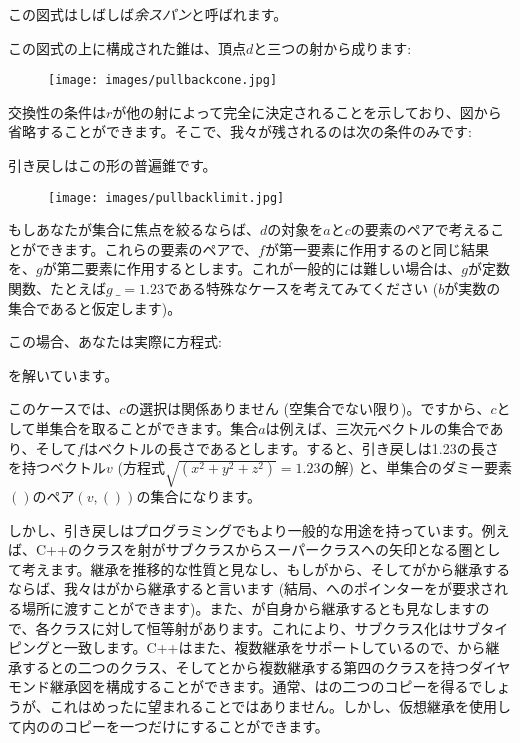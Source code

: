 
この図式はしばしば\emph{余スパン}と呼ばれます。

この図式の上に構成された錐は、頂点$d$と三つの射から成ります: 


\begin{figure}[H]
  \centering
  \texttt{[image: images/pullbackcone.jpg]}
\end{figure}

\noindent
交換性の条件は$r$が他の射によって完全に決定されることを示しており、図から省略することができます。そこで、我々が残されるのは次の条件のみです: 


引き戻しはこの形の普遍錐です。

\begin{figure}[H]
  \centering
  \texttt{[image: images/pullbacklimit.jpg]}
\end{figure}

\noindent
もしあなたが集合に焦点を絞るならば、$d$の対象を$a$と$c$の要素のペアで考えることができます。これらの要素のペアで、$f$が第一要素に作用するのと同じ結果を、$g$が第二要素に作用するとします。これが一般的には難しい場合は、$g$が定数関数、たとえば$g~\_ = 1.23$である特殊なケースを考えてみてください ($b$が実数の集合であると仮定します)。

この場合、あなたは実際に方程式: 


を解いています。

このケースでは、$c$の選択は関係ありません (空集合でない限り)。ですから、$c$として単集合を取ることができます。集合$a$は例えば、三次元ベクトルの集合であり、そして$f$はベクトルの長さであるとします。すると、引き戻しは1.23の長さを持つベクトル$v$ (方程式$\sqrt{(x^{2}+y^{2}+z^{2})} = 1.23$の解) と、単集合のダミー要素$()$のペア$(v, ())$の集合になります。

しかし、引き戻しはプログラミングでもより一般的な用途を持っています。例えば、C++のクラスを射がサブクラスからスーパークラスへの矢印となる圏として考えます。継承を推移的な性質と見なし、もしがから、そしてがから継承するならば、我々はがから継承すると言います (結局、へのポインターをが要求される場所に渡すことができます)。また、が自身から継承するとも見なしますので、各クラスに対して恒等射があります。これにより、サブクラス化はサブタイピングと一致します。C++はまた、複数継承をサポートしているので、から継承するとの二つのクラス、そしてとから複数継承する第四のクラスを持つダイヤモンド継承図を構成することができます。通常、はの二つのコピーを得るでしょうが、これはめったに望まれることではありません。しかし、仮想継承を使用して内ののコピーを一つだけにすることができます。

